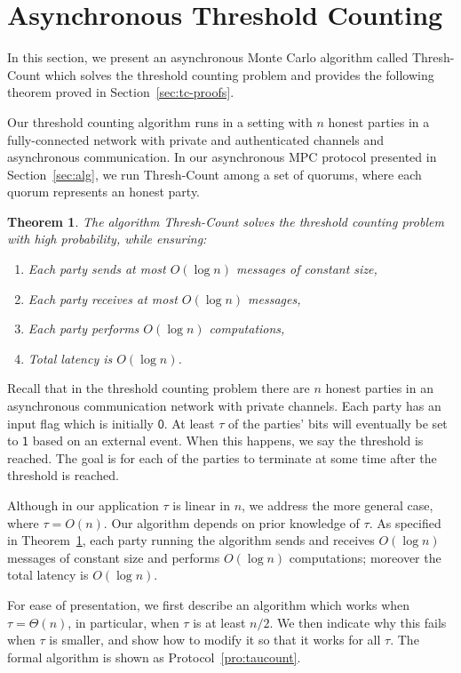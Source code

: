 \documentclass[11pt,letter]{article}
\newcommand{\alg}[1]{\mbox{\textsf{#1}}}
\theoremstyle{mytheoremstyle}
\newtheorem{theorem}{Theorem}
\begin{document}
\section{Asynchronous Threshold Counting}\label{sec:taucount}
In this section, we present an asynchronous Monte Carlo algorithm called \alg{Thresh-Count} which solves the threshold counting problem and provides the following theorem proved in Section~\ref{sec:tc-proofs}.

Our threshold counting algorithm runs in a setting with $n$ honest parties in a fully-connected network with private and authenticated channels and asynchronous communication. In our asynchronous MPC protocol presented in Section~\ref{sec:alg}, we run \alg{Thresh-Count} among a set of quorums, where each quorum represents an honest party.

\begin{theorem}
	The algorithm \alg{Thresh-Count} solves the threshold counting problem with high probability, while ensuring:
	\begin{enumerate}
		\item Each party sends at most $O(\log{n})$ messages of constant size,
		\item Each party receives at most  $O(\log{n})$ messages,
		\item Each party performs $O(\log{n})$ computations,
		\item Total latency is $O(\log{n})$.
	\end{enumerate}
	\label{thm:taucount}
\end{theorem}

Recall that in the threshold counting problem there are $n$ honest parties in an asynchronous communication network with private channels. Each party has an input flag which is initially $\mathsf{0}$. At least $\tau$ of the parties' bits will eventually be set to $\mathsf{1}$ based on an external event. When this happens, we say the threshold is reached. The goal is for each of the parties to terminate at some time after the threshold is reached.

Although in our application $\tau$ is linear in $n$, we address the more general case, where $\tau = O(n)$. Our algorithm depends on prior knowledge of $\tau$. As specified in Theorem~\ref{thm:taucount}, each party running the algorithm sends and receives $O(\log{n})$ messages of constant size and performs $O(\log n)$ computations; moreover the total latency is $O(\log{n})$.



For ease of presentation, we first describe an algorithm which works when $\tau = \Theta(n)$, in particular, when $\tau$ is at least $n/2$. We then indicate why this fails when $\tau$ is smaller, and show how to modify it so that it works for all $\tau$. The formal algorithm is shown as Protocol~\ref{pro:taucount}.
\end{document}
